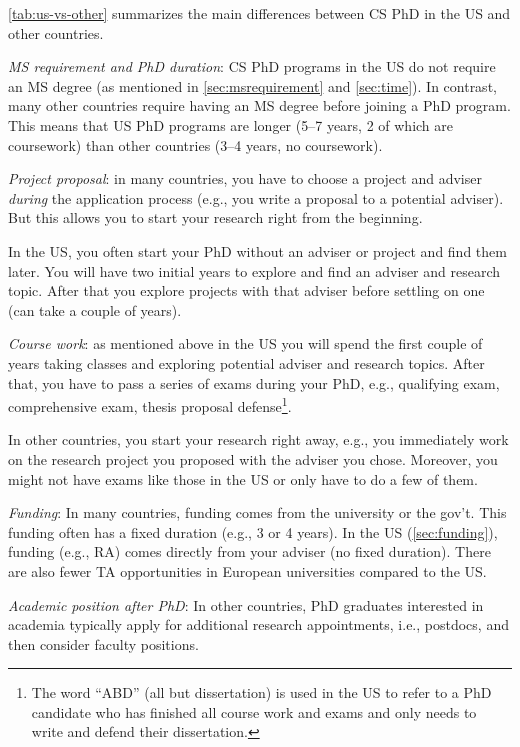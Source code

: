 \documentclass[oneside,11pt,dvipsnames]{book}
\begin{document}
\autoref{tab:us-vs-other} summarizes the main differences between CS PhD in the US and other countries. %

\emph{MS requirement and PhD duration}:  CS PhD programs in the US do not require an MS degree (as mentioned in \autoref{sec:msrequirement} and \autoref{sec:time}).  In contrast, many other countries require having an MS degree before joining a PhD program.  This means that US PhD programs are longer (5--7 years, 2 of which are coursework) than other countries (3--4 years, no coursework).

\emph{Project proposal}: in many countries, you have to choose a project and adviser \emph{during} the application process (e.g., you write a proposal to a potential adviser). But this allows you to start your research right from the beginning. 

In the US, you often start your PhD without an adviser or project and find them later. You will have two initial years to explore and find an adviser and research topic. After that you explore projects with that adviser before settling on one (can take a couple of years). 

\emph{Course work}: as mentioned above in the US you will spend the first couple of years taking classes and exploring potential adviser and research topics. 
After that, you have to pass a series of exams during your PhD, e.g., qualifying exam, comprehensive exam, thesis proposal defense\footnote{The word ``ABD'' (all but dissertation) is used in the US to refer to a PhD candidate who has finished all course work and exams and only needs to write and defend their dissertation.}.

In other countries, you start your research right away, e.g., you immediately work on the research project you proposed with the adviser you chose. Moreover, you might not have exams like those in the US or only have to do a few of them.

\emph{Funding}:  In many countries, funding comes from the university or the gov't. This funding often has a fixed duration (e.g., 3 or 4 years).  In the US (\autoref{sec:funding}), funding (e.g., RA) comes directly from your adviser (no fixed duration).  There are also fewer TA opportunities in European universities compared to the US.

\emph{Academic position after PhD}: In other countries, PhD graduates interested in academia typically apply for additional research appointments, i.e., postdocs, and then consider faculty positions. 
\end{document}
